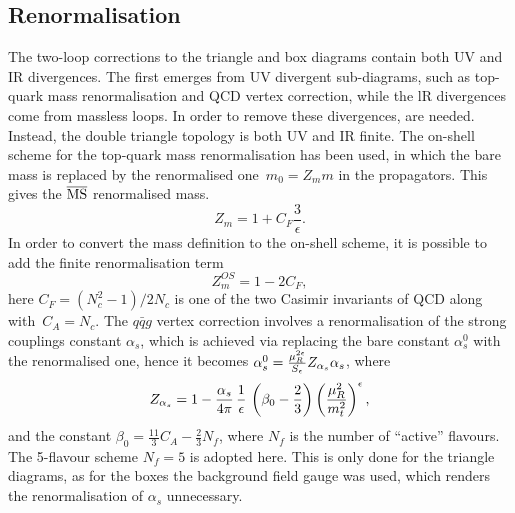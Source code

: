 \subsection{Renormalisation}
\label{subsec:ren}
\par The two-loop corrections to the triangle and box diagrams contain both UV and IR divergences. The first emerges from UV divergent sub-diagrams, such as top-quark mass renormalisation and QCD vertex correction, while the lR divergences come from massless loops. In order to remove these divergences, are needed. Instead, the double triangle topology is both UV and IR finite.
The on-shell scheme for the top-quark mass renormalisation has been used, in which the bare mass is replaced by the renormalised one~$ m_0 = Z_m m$  in the propagators. This gives the $\overline{\mathrm{MS}}$ renormalised mass. 
\begin{equation}
	Z_m = 1+ C_F \frac{3}{\epsilon}.
\end{equation}
In order to convert the mass definition to the on-shell scheme, it is possible to add the finite renormalisation term
\begin{equation}
	Z^{OS}_m = 1- 2 C_F,
\end{equation}
here $C_F=(N_c^2-1)/2N_c$ is one of the two Casimir invariants of QCD along with~$ C_A=N_c$. 
The $q \bar q g$ vertex correction involves a renormalisation of the strong couplings constant $ \alpha_s$, which is achieved via replacing the bare constant $\alpha_s^0$ with the renormalised one, hence it becomes  $ \alpha^0_s = \frac{\mu_R^{2\epsilon}}{S_\epsilon}  Z_{\alpha_s} \alpha_s$, where
\begin{equation}
	Z_{\alpha_s} = 1- \frac{\alpha_s}{4 \pi} \, \frac{1}{ \epsilon}\,  \left( \beta_0-\frac{2}{3} \right) \left(\frac{\mu_R^2}{m_t^2} \right) ^\epsilon,
\end{equation}
and the constant $ \beta_0 = \frac{11}{3} C_A -\frac{2}{3}N_f$, where $N_f$ is the number of ``active'' flavours. The 5-flavour scheme $N_f=5$ is adopted here.  This is only done for the triangle diagrams, as for the boxes the background field gauge was used, which renders the renormalisation of $\alpha_s$ unnecessary. 
